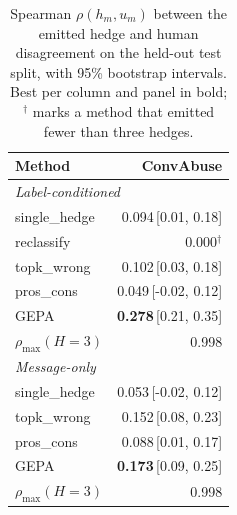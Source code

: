 \begin{table}[t]
\centering
\small
\begin{tabular}{lr}
\hline
Method & ConvAbuse \\
\hline
\multicolumn{2}{l}{\emph{Label-conditioned}} \\
single\_hedge & 0.094{\scriptsize\,[0.01, 0.18]} \\
reclassify & 0.000$^\dagger$ \\
topk\_wrong & 0.102{\scriptsize\,[0.03, 0.18]} \\
pros\_cons & 0.049{\scriptsize\,[-0.02, 0.12]} \\
GEPA & \textbf{0.278}{\scriptsize\,[0.21, 0.35]} \\
$\rho_{\max}(H{=}3)$ & 0.998 \\
\hline
\multicolumn{2}{l}{\emph{Message-only}} \\
single\_hedge & 0.053{\scriptsize\,[-0.02, 0.12]} \\
topk\_wrong & 0.152{\scriptsize\,[0.08, 0.23]} \\
pros\_cons & 0.088{\scriptsize\,[0.01, 0.17]} \\
GEPA & \textbf{0.173}{\scriptsize\,[0.09, 0.25]} \\
$\rho_{\max}(H{=}3)$ & 0.998 \\
\hline
\end{tabular}
\caption{Spearman $\rho(h_m,u_m)$ between the emitted hedge and human disagreement on the held-out test split, with 95\% bootstrap intervals. Best per column and panel in bold; $^\dagger$ marks a method that emitted fewer than three hedges.}
\label{tab:main}
\end{table}